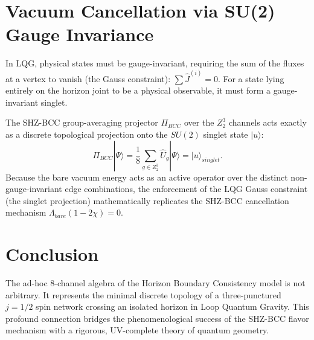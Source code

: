 \documentclass[11pt,a4paper]{article}
\begin{document}
\section{Vacuum Cancellation via SU(2) Gauge Invariance}
In LQG, physical states must be gauge-invariant, requiring the sum of the fluxes at a vertex to vanish (the Gauss constraint): $\sum \hat{J}^{(i)} = 0$. For a state lying entirely on the horizon joint to be a physical observable, it must form a gauge-invariant singlet.

The SHZ-BCC group-averaging projector $\Pi_{BCC}$ over the $Z_2^3$ channels acts exactly as a discrete topological projection onto the $SU(2)$ singlet state $|u\rangle$:
\begin{equation}
    \Pi_{BCC} | \Psi \rangle = \frac{1}{8} \sum_{g \in Z_2^3} \hat{U}_g | \Psi \rangle = | u \rangle_{singlet}.
\end{equation}
Because the bare vacuum energy acts as an active operator over the distinct non-gauge-invariant edge combinations, the enforcement of the LQG Gauss constraint (the singlet projection) mathematically replicates the SHZ-BCC cancellation mechanism $\Lambda_{bare}(1-2\chi) = 0$.

\section{Conclusion}
The ad-hoc 8-channel algebra of the Horizon Boundary Consistency model is not arbitrary. It represents the minimal discrete topology of a three-punctured $j=1/2$ spin network crossing an isolated horizon in Loop Quantum Gravity. This profound connection bridges the phenomenological success of the SHZ-BCC flavor mechanism with a rigorous, UV-complete theory of quantum geometry.
\end{document}
